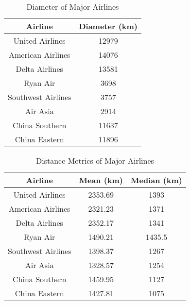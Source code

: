\documentclass[twocolumn]{tum-article}
\begin{document}
\begin{table}[ht]
\begin{center}
 \begin{tabular}{| c | c |}
 \hline
 \textbf{Airline} & \textbf{Diameter (km)} \\ [0.5ex]
 \hline
 United Airlines & 12979 \\
 \hline
 American Airlines & 14076 \\
 \hline
 Delta Airlines & 13581 \\
 \hline
 Ryan Air & 3698 \\
 \hline
 Southwest Airlines & 3757 \\
 \hline
 Air Asia & 2914 \\
 \hline
 China Southern & 11637 \\
 \hline
 China Eastern & 11896 \\
 \hline
 \end{tabular}
\caption{Diameter of Major Airlines}
\label{Tab:diameter_metrics}
\end{center}
\end{table}



\begin{table}[ht]
\begin{center}
 \begin{tabular}{| c | c | c |}
 \hline
 \textbf{Airline} & \textbf{Mean (km)} & \textbf{Median (km)} \\ [0.5ex]
 \hline
 United Airlines & 2353.69 & 1393 \\
 \hline
 American Airlines & 2321.23 & 1371 \\
 \hline
 Delta Airlines & 2352.17 & 1341 \\
 \hline
 Ryan Air & 1490.21 & 1435.5 \\
 \hline
 Southwest Airlines & 1398.37 & 1267 \\
 \hline
 Air Asia & 1328.57 & 1254 \\
 \hline
 China Southern & 1459.95 & 1127 \\
 \hline
 China Eastern & 1427.81 & 1075 \\
 \hline
 \end{tabular}
\caption{Distance Metrics of Major Airlines}
\label{Tab:distance_airlines}
\end{center}
\end{table}
\end{document}
